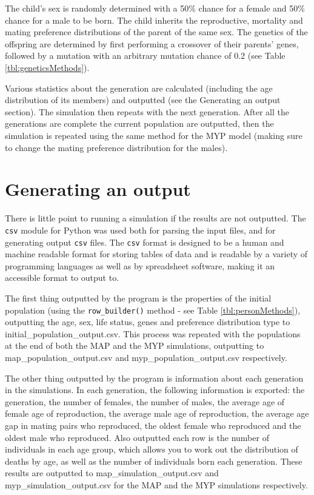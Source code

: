 \documentclass[authoryearcitations]{UoYCSproject}
\begin{document}
The child's sex is randomly determined with a 50\% chance for a female and 50\% chance for a male to be born. The child inherits the reproductive, mortality and mating preference distributions of the parent of the same sex. The genetics of the offspring are determined by first performing a crossover of their parents' genes, followed by a mutation with an arbitrary mutation chance of 0.2 (see Table \ref{tbl:geneticsMethods}).

Various statistics about the generation are calculated (including the age distribution of its members) and outputted (see the Generating an output section). The simulation then repeats with the next generation. After all the generations are complete the current population are outputted, then the simulation is repeated using the same method for the MYP model (making sure to change the mating preference distribution for the males).

\section{Generating an output}
There is little point to running a simulation if the results are not outputted. The \texttt{csv} module for Python was used both for parsing the input files, and for generating output \texttt{csv} files. The \texttt{csv} format is designed to be a human and machine readable format for storing tables of data and is readable by a variety of programming languages as well as by spreadsheet software, making it an accessible format to output to.

The first thing outputted by the program is the properties of the initial population (using the \texttt{row\_builder()} method - see Table \ref{tbl:personMethods}), outputting the age, sex, life status, genes and preference distribution type to initial\_population\_output.csv. This process was repeated with the populations at the end of both the MAP and the MYP simulations, outputting to map\_population\_output.csv and myp\_population\_output.csv respectively.

The other thing outputted by the program is information about each generation in the simulations. In each generation, the following information is exported: the generation, the number of females, the number of males, the average age of female age of reproduction, the average male age of reproduction, the average age gap in mating pairs who reproduced, the oldest female who reproduced and the oldest male who reproduced. Also outputted each row is the number of individuals in each age group, which allows you to work out the distribution of deaths by age, as well as the number of individuals born each generation. These results are outputted to map\_simulation\_output.csv and myp\_simulation\_output.csv for the MAP and the MYP simulations respectively.
\end{document}
